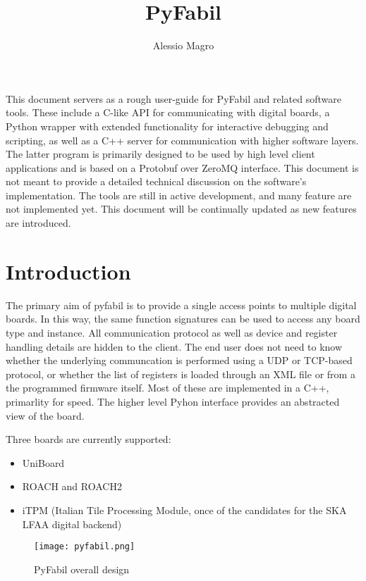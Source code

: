 \documentclass[a4paper,11pt]{article}
\title{PyFabil}
\author{Alessio Magro}
\date{}
\begin{document}
\sloppy
\maketitle

This document servers as a rough user-guide for PyFabil and related software 
tools. These include a C-like API for communicating with digital boards, a 
Python wrapper with extended functionality for interactive debugging and 
scripting, as well as a C++ server for communication with higher software 
layers. The latter program is primarily designed to be used by high level 
client applications and is based on a Protobuf over ZeroMQ interface. This 
document is not meant to provide a detailed technical discussion on the 
software's implementation. The tools are still in active development, and many 
feature are not implemented yet. This document will be continually updated as 
new features are introduced. 

\section{Introduction}

The primary aim of pyfabil is to provide a single access points to multiple 
digital boards. In this way, the same function signatures can be used to access 
any board type and instance. All communication protocol as well as 
device and register handling details are hidden to the client. The end user 
does not need to know whether the underlying communcation is performed using a 
UDP or TCP-based protocol, or whether the list of registers is loaded through 
an XML file or from a the programmed firmware itself. Most of these are 
implemented in a C++, primarlity for speed. The higher level Pyhon interface 
provides an abstracted view of the board. 

Three boards are currently supported:
\begin{itemize}
 \item UniBoard
 \item ROACH and ROACH2
 \item iTPM (Italian Tile Processing Module, once of the candidates for the SKA 
LFAA digital backend)
\end{itemize}

\begin{figure}[t]
\centering
\texttt{[image: pyfabil.png]}
\caption{PyFabil overall design}
\label{pyfabil_design}
\end{figure}
\end{document}
